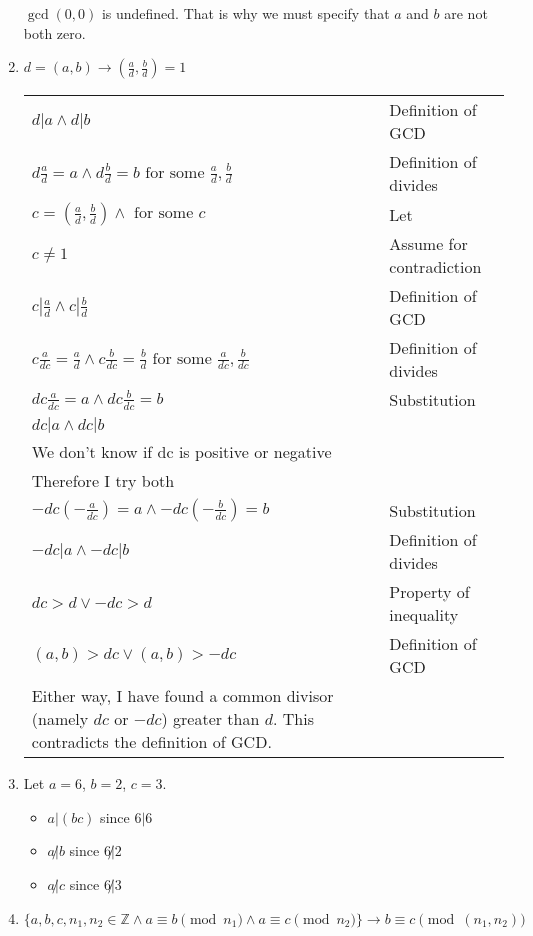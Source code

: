 \documentclass[12pt,letterpaper]{article}
\makeatletter
\newcommand{\fs}{\textrm{~for some~}}
\newenvironment{proof}{
\mbox{}\vspace*{-1.68\baselineskip}
\begin{longtable}[l]{@{} l l}
}{
\tiny {$~\blacksquare$}
\end{longtable}
}
\makeatother
\begin{document}
\begin{enumerate}[leftmargin=0cm]
$\gcd(0, 0)$ is undefined. That is why we must specify that $a$ and $b$ are not both zero.

\item
$d = (a, b) \rightarrow (\frac{a}{d}, \frac{b}{d}) = 1$

\begin{proof}
$d|a \wedge d|b$ & Definition of GCD \\
$d \frac{a}{d} = a \wedge d \frac{b}{d} = b \fs \frac{a}{d}, \frac{b}{d}$ & Definition of divides \\
$c = (\frac{a}{d}, \frac{b}{d}) \wedge \fs c $ & Let \\
$c \neq 1$ & Assume for contradiction \\
$c|\frac{a}{d} \wedge c|\frac{b}{d}$ & Definition of GCD \\
$c \frac{a}{dc} = \frac{a}{d} \wedge c \frac{b}{dc} = \frac{b}{d} \fs \frac{a}{dc}, \frac{b}{dc}$ & Definition of divides \\
$d c \frac{a}{dc} = a \wedge d c \frac{b}{dc} = b$ & Substitution \\
$dc | a \wedge dc | b$ \\
We don't know if dc is positive or negative \\
Therefore I try both \\
$-d c (-\frac{a}{dc}) = a \wedge -d c (-\frac{b}{dc}) = b$ & Substitution \\
$-dc | a \wedge -dc | b$ & Definition of divides \\
$dc > d \vee -dc > d$ & Property of inequality \\
$(a, b) > dc \vee (a, b) > -dc$ & Definition of GCD \\
\parbox[t]{11cm}{Either way, I have found a common divisor (namely $dc$ or $-dc$) greater than $d$. This contradicts the definition of GCD.}\\
$c = 1$ & Contradiction \\
$1 = (\frac{a}{d}, \frac{b}{d})$ & Substitution
\end{proof}

\item Let $a = 6$, $b = 2$, $c = 3$.
\begin{itemize}
\item $a|(bc)$ since $6 | 6$
\item $a \not | b$ since $6 \not | 2$
\item $a \not | c$ since $6 \not | 3$
\end{itemize}

\item
$\{a, b, c, n_1, n_2 \in \mathbb{Z} \wedge a \equiv b \pmod{n_1} \wedge a \equiv c \pmod{n_2}\} \rightarrow b \equiv c \pmod{(n_1, n_2)}$


\end{enumerate}
\end{document}
